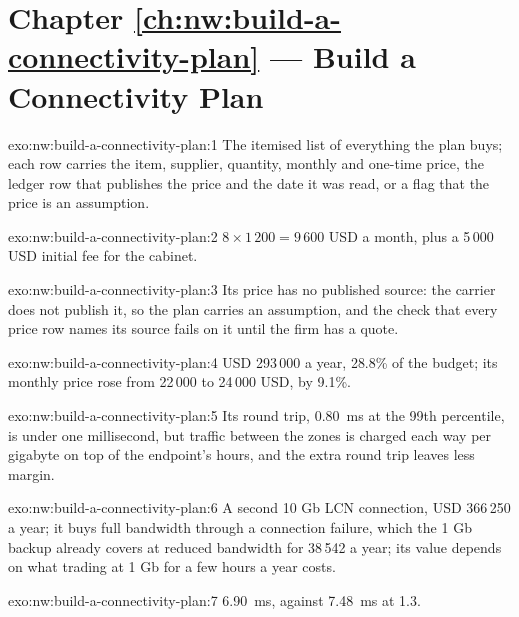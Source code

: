 \section*{Chapter \ref{ch:nw:build-a-connectivity-plan} --- Build a Connectivity Plan}

\begin{solution}{exo:nw:build-a-connectivity-plan:1}
The itemised list of everything the plan buys; each row carries the item, supplier, quantity, monthly and one-time price, the ledger row
that publishes the price and the date it was read, or a flag that the price is an assumption.
\end{solution}

\begin{solution}{exo:nw:build-a-connectivity-plan:2}
$8 \times 1\,200 = 9\,600$ USD a month, plus a 5\,000 USD initial fee for the cabinet.
\end{solution}

\begin{solution}{exo:nw:build-a-connectivity-plan:3}
Its price has no published source: the carrier does not publish it, so the plan carries an assumption, and the check that every price row
names its source fails on it until the firm has a quote.
\end{solution}

\begin{solution}{exo:nw:build-a-connectivity-plan:4}
USD 293\,000 a year, 28.8\% of the budget; its monthly price rose from 22\,000 to 24\,000 USD, by 9.1\%.
\end{solution}

\begin{solution}{exo:nw:build-a-connectivity-plan:5}
Its round trip, \qty{0.80}{\milli\second} at the 99th percentile, is under one millisecond, but traffic between the zones is charged each
way per gigabyte on top of the endpoint's hours, and the extra round trip leaves less margin.
\end{solution}

\begin{solution}{exo:nw:build-a-connectivity-plan:6}
A second 10 Gb LCN connection, USD 366\,250 a year; it buys full bandwidth through a connection failure, which the 1 Gb backup already
covers at reduced bandwidth for 38\,542 a year; its value depends on what trading at 1 Gb for a few hours a year costs.
\end{solution}

\begin{solution}{exo:nw:build-a-connectivity-plan:7}
\qty{6.90}{\milli\second}, against \qty{7.48}{\milli\second} at 1.3.
\end{solution}

